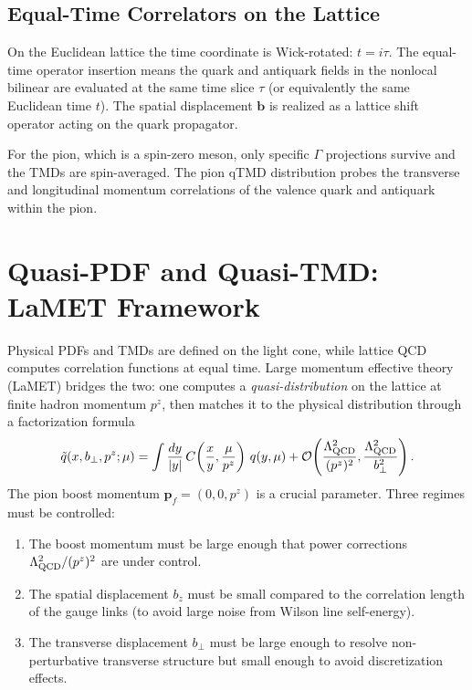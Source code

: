 \documentclass[11pt,a4paper]{article}
\begin{document}
\subsection{Equal-Time Correlators on the Lattice}

On the Euclidean lattice the time coordinate is Wick-rotated: $t = i\tau$.
The equal-time operator insertion means the quark and antiquark fields in the
nonlocal bilinear are evaluated at the same time slice $\tau$ (or equivalently
the same Euclidean time $t$).  The spatial displacement $\mathbf{b}$ is
realized as a lattice shift operator acting on the quark propagator.

For the pion, which is a spin-zero meson, only specific $\Gamma$ projections
survive and the TMDs are spin-averaged.  The pion qTMD distribution probes
the transverse and longitudinal momentum correlations of the valence quark and
antiquark within the pion.

\section{Quasi-PDF and Quasi-TMD: LaMET Framework}
\label{sec:lamet}

Physical PDFs and TMDs are defined on the light cone, while lattice QCD
computes correlation functions at equal time.  Large momentum effective theory
(LaMET) \cite{Ji:2013dva,Ji:2014gla} bridges the two:  one computes a
\emph{quasi-distribution} on the lattice at finite hadron momentum $p^z$, then
matches it to the physical distribution through a factorization formula
\begin{equation}
  \tilde q(x, b_\perp, p^z; \mu)
  =
  \int \frac{dy}{|y|}\,
  C\!\left(\frac{x}{y}, \frac{\mu}{p^z}\right)\,
  q(y, \mu)
  + \mathcal{O}\!\left(\frac{\Lambda_{\rm QCD}^2}{(p^z)^2},
                         \frac{\Lambda_{\rm QCD}^2}{b_\perp^2}\right).
\end{equation}
The pion boost momentum $\mathbf{p}_f = (0,0,p^z)$ is a crucial parameter.
Three regimes must be controlled:
\begin{enumerate}[label=(\roman*)]
  \item The boost momentum must be large enough that power corrections
        $\Lambda_{\rm QCD}^2/(p^z)^2$ are under control.
  \item The spatial displacement $b_z$ must be small compared to the
        correlation length of the gauge links (to avoid large noise from
        Wilson line self-energy).
  \item The transverse displacement $b_\perp$ must be large enough to resolve
        non-perturbative transverse structure but small enough to avoid
        discretization effects.
\end{enumerate}
\end{document}
